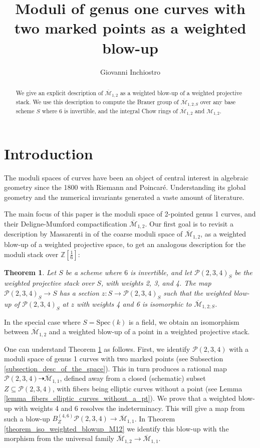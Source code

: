 \documentclass[11pt]{amsart}
\author{Giovanni Inchiostro}
\title{Moduli of genus one curves with two marked points as a weighted blow-up}
\newtheorem{theorem}{Theorem}[section]
\theoremstyle{definition}
\theoremstyle{remark}
\newcommand{\calM}{\mathcal M}
\newcommand{\calP}{\mathcal P}
\newcommand{\Spec}{\mathrm{Spec}}
\begin{document}
\begin{abstract}
We give an explicit description of $\overline{\calM}_{1,2}$ as a weighted blow-up of a weighted projective stack. We use this description to compute the Brauer group of $\overline{\calM}_{1,2;S}$ over any base scheme $S$ where 6 is invertible, and the integral Chow rings of 
$\overline{\calM}_{1,2}$ and $\calM_{1,2}$.
\end{abstract}
\maketitle
\section{Introduction} The moduli spaces of curves have been an object of central interest in algebraic geometry since the
1800 with Riemann and Poincaré. Understanding its global geometry and the numerical invariants
generated a vaste amount of literature.

The main focus of this paper is the moduli space of 2-pointed genus 1 curves, and their Deligne-Mumford compactification $\overline{\calM}_{1,2}$. Our first goal is to revisit a description by Massarenti in \cite{Mas14} of the coarse moduli space of $\overline{\calM}_{1,2}$, as a weighted blow-up of a weighted projective space, to get an analogous description for the moduli stack over $\mathbb{Z}[\frac{1}{6}]$:
\begin{theorem}\label{theorem:intro:weighted}Let $S$ be a scheme where $6$ is invertible, and let $\calP(2,3,4)_S$ be the weighted projective stack over $S$, with weights 2, 3, and 4. The map $\calP(2,3,4)_S\to S$ has a section $z:S\to \calP(2,3,4)_S$ such that the weighted blow-up of $\calP(2,3,4)_S$ at $z$ with weights 4 and 6 is isomorphic to $\overline{\calM}_{1,2;S}$.
\end{theorem}
In the special case where $S=\Spec(k)$ is a field, we obtain an isomorphism between $\overline{\calM}_{1,2}$ and a weighted blow-up of a point in a weighted projective stack.

One can understand Theorem \ref{theorem:intro:weighted} as follows. First, we identify $\calP(2,3,4)$ with a moduli space of genus 1 curves with two marked points (see Subsection \ref{subsection_desc_of_the_space}). This in turn produces a rational map $\calP(2,3,4)\dashrightarrow \overline{\calM}_{1,1}$, defined away from a closed (schematic) subset $Z\subseteq \calP(2,3,4)$, with fibers being elliptic curves without a point (see Lemma \ref{lemma_fibers_elliptic_curves_without_a_pt}). We prove  that a weighted blow-up with weights 4 and 6 resolves the indeterminacy. This will give a map from such a blow-up $B_Z^{(4,6)}\calP(2,3,4)\to \overline{\calM}_{1,1}$. In Theorem \ref{theorem_iso_weighted_blowup_M12} we identify this blow-up with the morphism from the universal family $\overline{\calM}_{1,2} \to \overline{\calM}_{1,1}$.
\end{document}
